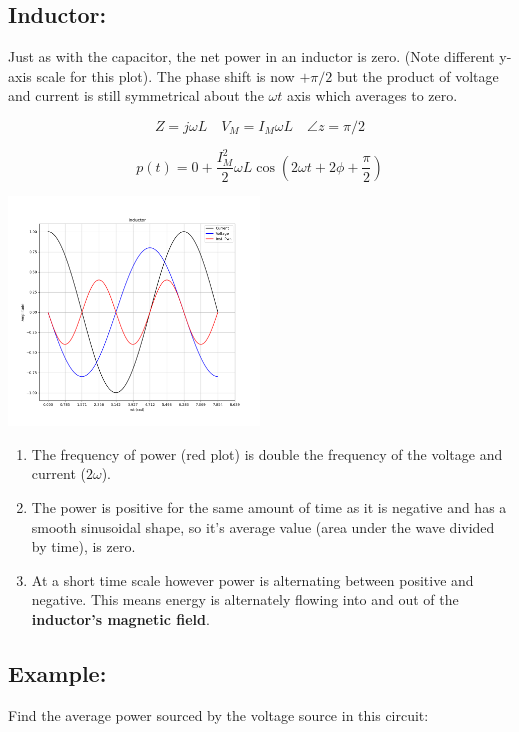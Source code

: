 \subsection*{Inductor:}

Just as with the capacitor, the net power in an inductor is zero. (Note
different y-axis scale for this plot).
The phase shift is now $+\pi/2$ but the product of voltage and current
is still symmetrical about the $\omega t$ axis which averages to zero.

\[
Z = j\omega L \quad V_M = I_M \omega L \quad \angle z = \pi/2
\]

\[
p(t) = 0 + \frac{I_M^2}{2} \omega L \cos(2\omega t + 2\phi + \frac{\pi}{2})
\]

\includegraphics[width=0.5\textwidth]{figsChapt03/LN19448.png}


\begin{enumerate}
    \item The frequency of power (red plot) is double the frequency of the voltage and current ($2\omega$).
    \item The power is positive for the same amount of time as it is
    negative and has a smooth sinusoidal shape, so it's average value
    (area under the wave divided by time), is zero.
    \item At a short time scale however power is alternating between
    positive and negative.  This means energy is alternately flowing
    into and out of the {\bf inductor's magnetic field}.
\end{enumerate}




\subsection*{Example:}


Find the average power sourced by the voltage source in this circuit:


